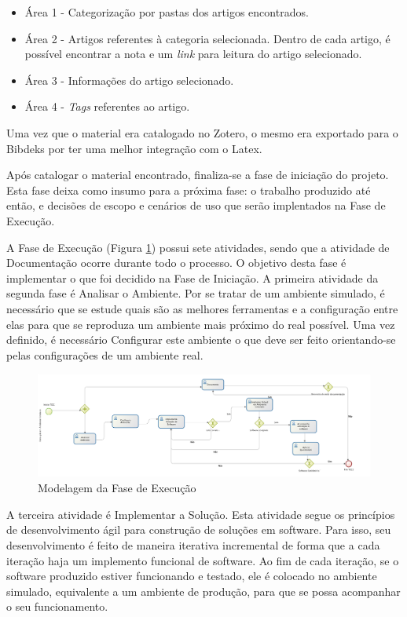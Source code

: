 \begin{itemize}
\item Área 1 - Categorização por pastas dos artigos encontrados.
\item Área 2 - Artigos referentes à categoria selecionada. Dentro de cada artigo, é possível encontrar a nota e um \textit{link} para leitura do artigo selecionado.
\item Área 3 - Informações do artigo selecionado.
\item Área 4 - \textit{Tags} referentes ao artigo.
\end{itemize}
Uma vez que o material era catalogado no Zotero, o mesmo era exportado para o Bibdeks por ter uma melhor integração com o Latex.

Após catalogar o material encontrado, finaliza-se a fase de iniciação do projeto. Esta fase deixa como insumo para a próxima fase: o trabalho produzido até então, e decisões de escopo e cenários de uso que serão implentados na Fase de Execução. 

A Fase de Execução (Figura \ref{img:execucao}) possui sete atividades, sendo que a atividade de Documentação ocorre durante todo o processo. O objetivo desta fase é implementar o que foi decidido na Fase de Iniciação. A primeira atividade da segunda fase é Analisar o Ambiente. Por se tratar de um ambiente simulado, é necessário que se estude quais são as melhores ferramentas e a configuração entre elas para que se reproduza um ambiente mais próximo do real possível. Uma vez definido, é necessário Configurar este ambiente  o que deve ser feito orientando-se pelas configurações de um ambiente real.

\graphicspath{{figuras/}}
\begin{figure}[h!]
\centering
\includegraphics[scale=0.40]{execucao}
\caption{Modelagem da Fase de Execução}
\label{img:execucao}
\end{figure}

A terceira atividade é Implementar a Solução. Esta atividade segue os princípios de desenvolvimento ágil para construção de soluções em software. Para isso, seu desenvolvimento é feito de maneira iterativa incremental de forma que a cada iteração haja um implemento funcional de software. Ao fim de cada iteração, se o software produzido estiver funcionando e testado, ele é colocado no ambiente simulado, equivalente a um ambiente de produção, para que se possa acompanhar o seu funcionamento.

